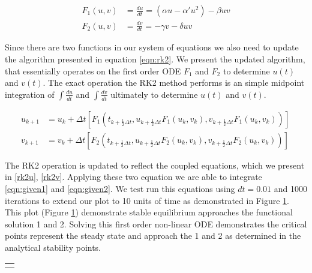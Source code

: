 \documentclass{article}
\begin{document}
\begin{align}
F_1(u,v) &= \frac{du}{dt} = (\alpha u - \alpha' u^2) - \beta u v\\
F_2(u,v) &= \frac{dv}{dt} = -\gamma v - \delta u v
\end{align}

Since there are two functions in our system of equations we also need to update the algorithm presented in equation \eqref{eqn:rk2}. We present the updated algorithm, that essentially operates on the first order ODE $F_1$ and $F_2$ to determine  $u(t)$ and $v(t)$. The exact operation the RK2 method performs is an simple midpoint integration of $\int \frac{du}{dt}$ and $\int \frac{dv}{dt}$ ultimately to determine $u(t)$ and $v(t)$.

\begin{subequations}
\begin{align}
\label{rk2u} u_{k+1} &= u_k + \Delta t \left[F_1\left(t_{k+\frac{1}{2}\Delta t}, u_{k + \frac{1}{2}\Delta t} F_1(u_k, v_k), v_{k + \frac{1}{2}\Delta t} F_1(u_k, v_k)\right)\right]\\
\label{rk2v} v_{k+1} &=  v_k + \Delta t \left[F_2\left(t_{k+\frac{1}{2}\Delta t}, u_{k + \frac{1}{2}\Delta t} F_2(u_k, v_k), v_{k + \frac{1}{2}\Delta t} F_2(u_k, v_k)\right)\right]\
\end{align}
\end{subequations}

The RK2 operation is updated to reflect the coupled equations, which we present in \eqref{rk2u}, \eqref{rk2v}. Applying these two equation we are able to integrate \eqref{eqn:given1} and \eqref{eqn:given2}. We test run this equations using $dt=0.01$ and 1000 iterations to extend our plot to 10 units of time as demonstrated in Figure \ref{fig:timeplot}. This plot (Figure \ref{fig:timeplot}) demonstrate stable equilibrium approaches the functional solution 1 and 2. Solving this first order non-linear ODE demonstrates the critical points represent the steady state and approach the 1 and 2 as determined in the analytical stability points.
\begin{table}[H]
\centering
\begin{tabularx}{\columnwidth}{X}
    \centering
    \resizebox{!}{.15\paperheight}{}
    \captionof{figure}{$dt=0.01, $ $iter=1000$}\label{fig:timeplot}
\end{tabularx}
\end{table}
\end{document}
